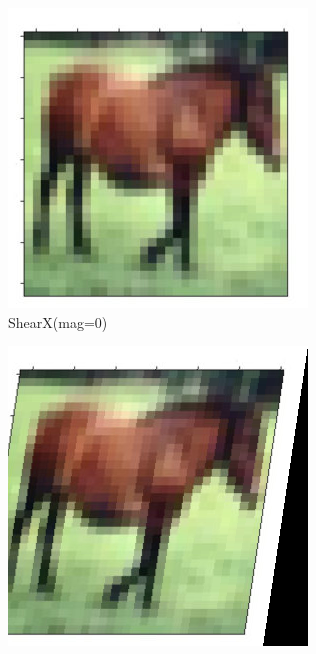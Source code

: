 \documentclass[onecolumn]{ujarticle}   %
\begin{document}
\begin{figure}[h]
      \begin{subfigure}{0.3\columnwidth}
        \centering
        \includegraphics[width=1.0\columnwidth]{transform_test/ShearX_0.png}
        \caption{ShearX(mag=0)}
        \label{fig:ShearX_0}
      \end{subfigure}
      \begin{subfigure}{0.3\columnwidth}
        \centering
        \includegraphics[width=1.0\columnwidth]{transform_test/ShearX_15.png}

\end{subfigure}
\end{figure}
\end{document}
